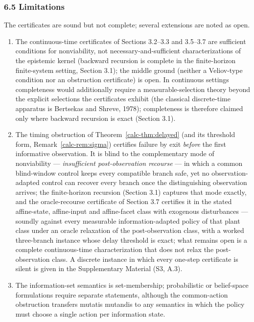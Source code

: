 \documentclass[10pt,twocolumn]{article}
\theoremstyle{definition}
\providecommand{\tightlist}{\setlength{\itemsep}{0pt}\setlength{\parskip}{0pt}}
\begin{document}
\subsubsection{6.5 Limitations}\label{calc-limitations}

The certificates are sound but not complete; several extensions are noted as open.

\begin{enumerate}
\def\labelenumi{(\roman{enumi})}
\tightlist
\item
  The continuous-time certificates of Sections 3.2--3.3 and 3.5--3.7 are sufficient conditions for nonviability, not necessary-and-sufficient characterizations of the epistemic kernel (backward recursion is complete in the finite-horizon finite-system setting, Section 3.1); the middle ground (neither a Veliov-type condition nor an obstruction certificate) is open. In
continuous settings completeness would additionally require a
measurable-selection theory beyond the explicit selections the
certificates exhibit (the classical discrete-time apparatus is
Bertsekas and Shreve, 1978); completeness is therefore claimed only where
backward recursion is exact (Section 3.1).
\item
  The timing obstruction of Theorem~\ref{calc-thm:delayed} (and its threshold form, Remark~\ref{calc-rem:sigma}) certifies failure by exit \emph{before} the first informative observation. It is blind to the complementary mode of nonviability --- \emph{insufficient post-observation recourse} --- in which a common blind-window control keeps every compatible branch safe, yet no observation-adapted control can recover every branch once the distinguishing observation arrives; the finite-horizon recursion (Section 3.1) captures that mode exactly, and the oracle-recourse certificate of Section 3.7 certifies it in the stated affine-state, affine-input and affine-facet class with exogenous disturbances --- soundly against every measurable information-adapted policy of that plant class under an oracle relaxation of the post-observation class, with a worked three-branch instance whose delay threshold is exact; what remains open is a complete continuous-time characterization that does not relax the post-observation class. A discrete instance in which every one-step certificate is silent is given in the Supplementary Material (S3, A.3).
\item
  The information-set semantics is set-membership; probabilistic or belief-space formulations require separate statements, although the common-action obstruction transfers mutatis mutandis to any semantics in which the policy must choose a single action per information state.

\end{enumerate}
\end{document}
